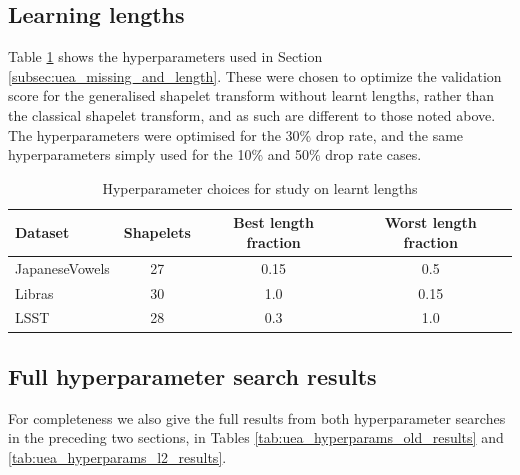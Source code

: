 \documentclass{article}
\theoremstyle{plain}
\theoremstyle{definition}
\begin{document}
	\subsection{Learning lengths}\label{apx:learninglengths}

	Table \ref{tab:uea_hyperparams_l2} shows the hyperparameters used in Section \ref{subsec:uea_missing_and_length}. These were chosen to optimize the validation score for the generalised shapelet transform without learnt lengths, rather than the classical shapelet transform, and as such are different to those noted above. The hyperparameters were optimised for the 30\% drop rate, and the same hyperparameters simply used for the 10\% and 50\% drop rate cases.

	\begin{table}[ht]
		\caption{Hyperparameter choices for study on learnt lengths}
		\label{tab:uea_hyperparams_l2}
		\centering
		\begin{tabular}{lccc}
			\toprule
			Dataset & Shapelets & Best length fraction & Worst length fraction \\
			\midrule
			JapaneseVowels  & 27 & 0.15 & 0.5 \\
			Libras          & 30 & 1.0 & 0.15 \\
			LSST            & 28 & 0.3 & 1.0 \\
			\bottomrule
		\end{tabular}
	\end{table}
	
	\subsection{Full hyperparameter search results}
	For completeness we also give the full results from both hyperparameter searches in the preceding two sections, in Tables \ref{tab:uea_hyperparams_old_results} and \ref{tab:uea_hyperparams_l2_results}.
\end{document}
